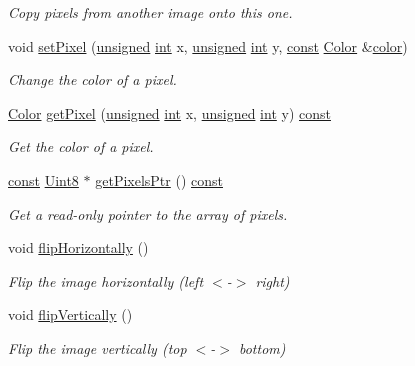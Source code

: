 \begin{DoxyCompactItemize}
\begin{DoxyCompactList}\small\item\em Copy pixels from another image onto this one. \end{DoxyCompactList}\item 
void \hyperlink{classsf_1_1_image_a9fd329b8cd7d4439e07fb5d3bb2d9744}{set\-Pixel} (\hyperlink{curses_8priv_8h_aca40206900cfc164654362fa8d4ad1e6}{unsigned} \hyperlink{term__entry_8h_ad65b480f8c8270356b45a9890f6499ae}{int} x, \hyperlink{curses_8priv_8h_aca40206900cfc164654362fa8d4ad1e6}{unsigned} \hyperlink{term__entry_8h_ad65b480f8c8270356b45a9890f6499ae}{int} y, \hyperlink{term__entry_8h_a57bd63ce7f9a353488880e3de6692d5a}{const} \hyperlink{classsf_1_1_color}{Color} \&\hyperlink{_entity_8cpp_a864889304a90873adb9c6e289a54bcf4}{color})
\begin{DoxyCompactList}\small\item\em Change the color of a pixel. \end{DoxyCompactList}\item 
\hyperlink{classsf_1_1_color}{Color} \hyperlink{classsf_1_1_image_a8c8460e311dcb00557cb00a81c29163d}{get\-Pixel} (\hyperlink{curses_8priv_8h_aca40206900cfc164654362fa8d4ad1e6}{unsigned} \hyperlink{term__entry_8h_ad65b480f8c8270356b45a9890f6499ae}{int} x, \hyperlink{curses_8priv_8h_aca40206900cfc164654362fa8d4ad1e6}{unsigned} \hyperlink{term__entry_8h_ad65b480f8c8270356b45a9890f6499ae}{int} y) \hyperlink{term__entry_8h_a57bd63ce7f9a353488880e3de6692d5a}{const} 
\begin{DoxyCompactList}\small\item\em Get the color of a pixel. \end{DoxyCompactList}\item 
\hyperlink{term__entry_8h_a57bd63ce7f9a353488880e3de6692d5a}{const} \hyperlink{namespacesf_a4ef3d630785c4f296f9b4f274c33d78e}{Uint8} $\ast$ \hyperlink{classsf_1_1_image_ac6137a608a9efaae2735c13ff259c214}{get\-Pixels\-Ptr} () \hyperlink{term__entry_8h_a57bd63ce7f9a353488880e3de6692d5a}{const} 
\begin{DoxyCompactList}\small\item\em Get a read-\/only pointer to the array of pixels. \end{DoxyCompactList}\item 
void \hyperlink{classsf_1_1_image_a57168e7bc29190e08bbd6c9c19f4bb2c}{flip\-Horizontally} ()
\begin{DoxyCompactList}\small\item\em Flip the image horizontally (left $<$-\/$>$ right) \end{DoxyCompactList}\item 
void \hyperlink{classsf_1_1_image_a78a702a7e49d1de2dec9894da99d279c}{flip\-Vertically} ()
\begin{DoxyCompactList}\small\item\em Flip the image vertically (top $<$-\/$>$ bottom) \end{DoxyCompactList}\end{DoxyCompactItemize}


